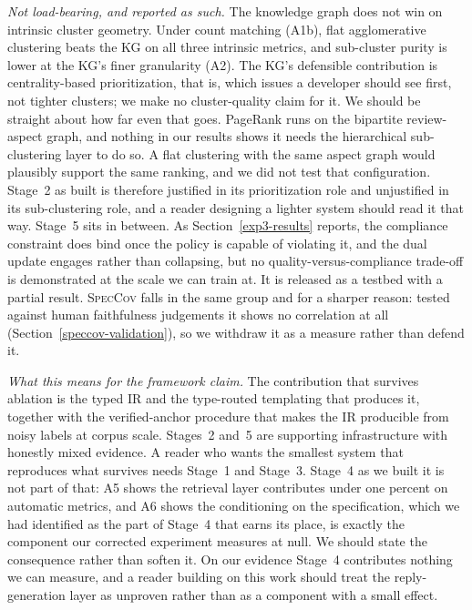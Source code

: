 \documentclass[preprint,12pt]{elsarticle}
\begin{document}
\emph{Not load-bearing, and reported as such.} The knowledge graph does not win on intrinsic
cluster geometry. Under count matching (A1b), flat agglomerative clustering beats the KG on all
three intrinsic metrics, and sub-cluster purity is lower at the KG's finer granularity (A2).
The KG's defensible contribution is centrality-based prioritization, that is, which issues a
developer should see first, not tighter clusters; we make no cluster-quality claim for it. We
should be straight about how far even that goes. PageRank runs on the bipartite review-aspect
graph, and nothing in our results shows it needs the hierarchical sub-clustering layer to do so.
A flat clustering with the same aspect graph would plausibly support the same ranking, and we did
not test that configuration. Stage~2 as built is therefore justified in its prioritization role
and unjustified in its sub-clustering role, and a reader designing a lighter system should read
it that way.
Stage~5 sits in between. As Section~\ref{exp3-results} reports, the compliance constraint does
bind once the policy is capable of violating it, and the dual update engages rather than
collapsing, but no quality-versus-compliance trade-off is demonstrated at the scale we can train
at. It is released as a testbed with a partial result.
\textsc{SpecCov} falls in the same group and for a sharper reason: tested against human
faithfulness judgements it shows no correlation at all (Section~\ref{speccov-validation}), so we
withdraw it as a measure rather than defend it.

\emph{What this means for the framework claim.} The contribution that survives ablation is the
typed IR and the type-routed templating that produces it, together with the verified-anchor
procedure that makes the IR producible from noisy labels at corpus scale. Stages~2 and~5 are
supporting infrastructure with honestly mixed evidence. A reader who wants the smallest system that reproduces what survives needs Stage~1 and Stage~3.
Stage~4 as we built it is not part of that: A5 shows the retrieval layer contributes under one
percent on automatic metrics, and A6 shows the conditioning on the specification, which we had
identified as the part of Stage~4 that earns its place, is exactly the component our corrected
experiment measures at null. We should state the consequence rather than soften it. On our
evidence Stage~4 contributes nothing we can measure, and a reader building on this work should
treat the reply-generation layer as unproven rather than as a component with a small effect.
\end{document}
